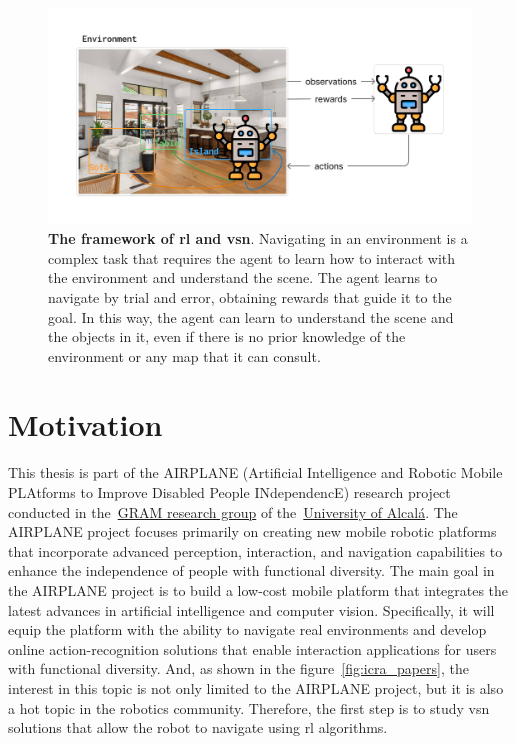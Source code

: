 \begin{figure}
    \centering
    \includegraphics[trim=30 30 30 30, clip, width=\textwidth]{figures/introduction/abstract_thesis}
    \caption{\textbf{The framework of \acrshort{rl} and \acrshort{vsn}}. Navigating in an environment is a complex task that requires the agent to learn how to interact with the environment and understand the scene. The agent learns to navigate by trial and error, obtaining rewards that guide it to the goal. In this way, the agent can learn to understand the scene and the objects in it, even if there is no prior knowledge of the environment or any map that it can consult.}
    \label{fig:abstract_thesis}
\end{figure}

\section{Motivation}\label{sec:motivation}

This thesis is part of the AIRPLANE (Artificial Intelligence and Robotic Mobile PLAtforms to Improve Disabled People INdependencE) research project conducted in the~\href{https://gramweb.uah.es/}{GRAM research group} of the~\href{https://www.uah.es/en/}{University of Alcalá}.
The AIRPLANE project focuses primarily on creating new mobile robotic platforms that incorporate advanced perception, interaction, and navigation capabilities to enhance the independence of people with functional diversity.
The main goal in the AIRPLANE project is to build a low-cost mobile platform that integrates the latest advances in artificial intelligence and computer vision.
Specifically, it will equip the platform with the ability to navigate real environments and develop online action-recognition solutions that enable interaction applications for users with functional diversity.
And, as shown in the figure~\ref{fig:icra_papers}, the interest in this topic is not only limited to the AIRPLANE project, but it is also a hot topic in the robotics community.
Therefore, the first step is to study \acrshort{vsn} solutions that allow the robot to navigate using \acrshort{rl} algorithms.

